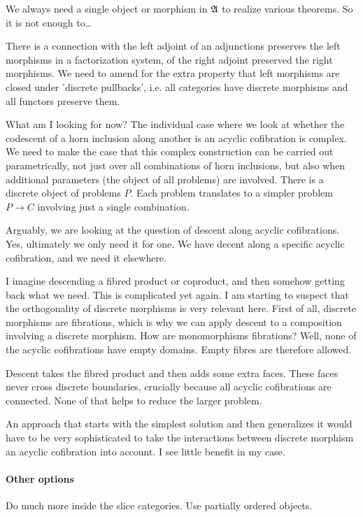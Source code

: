 \documentclass[csh.tex]{subfiles}
\begin{document}
We always need a single object or morphism in $\mathfrak A$ to realize various theorems. So it is not enough to\dots

There is a connection with the left adjoint of an adjunctions preserves the left morphisms in a factorization system, of the right adjoint preserved the right morphisms. We need to amend for the extra property that left morphisms are closed under 'discrete pullbacks', i.e. all categories have discrete morphisms and all functors preserve them.

What am I looking for now?
The individual case where we look at whether the codescent of a horn inclusion along another is an acyclic cofibration is complex. We need to make the case that this complex construction can be carried out parametrically, not just over all combinations of horn inclusions, but also when additional parameters (the object of all problems) are involved.
There is a discrete object of problems $P$. Each problem translates to a simpler problem $P \to C$ involving just a single combination.

Arguably, we are looking at the question of descent along acyclic cofibrations. Yes, ultimately we only need it for one. We have decent along a specific acyclic cofibration, and we need it elsewhere.

I imagine descending a fibred product or coproduct, and then somehow getting back what we need. This is complicated yet again.
I am starting to suspect that the orthogonality of discrete morphisms is very relevant here. First of all, discrete morphisms are fibrations, which is why we can apply descent to a composition involving a discrete morphism. How are monomorphisms fibrations? Well, none of the acyclic cofibrations have empty domains. Empty fibres are therefore allowed.

Descent takes the fibred product and then adds some extra faces. These faces never cross discrete boundaries, crucially because all acyclic cofibrations are connected. None of that helps to reduce the larger problem.

An approach that starts with the simplest solution and then generalizes it would have to be very sophisticated to take the interactions between discrete morphism an acyclic cofibration into account. I see little benefit in my case.

\paragraph{Other options}
Do much more inside the slice categories.
Use partially ordered objects.
\end{document}
